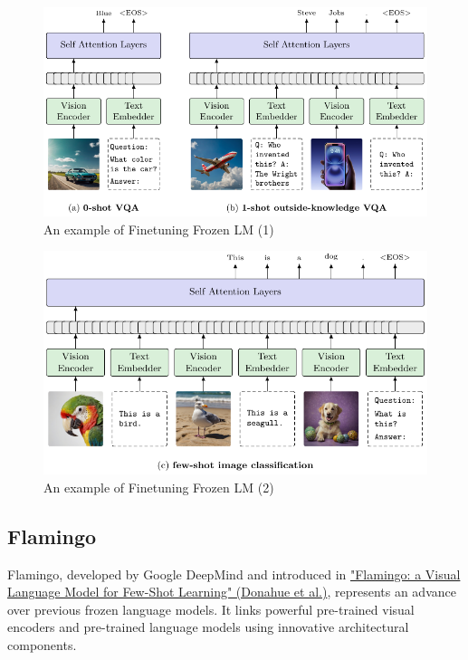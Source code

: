 \vspace{1cm}
\begin{figure}[!htbp]
    \centering
    \includegraphics[width=\linewidth]{tikz/chapter11 - Frozen LM Tasks 1.pdf}
    \caption{An example of Finetuning Frozen LM (1)}
\end{figure}

\begin{figure}[!htbp]
    \centering
    \includegraphics[width=\linewidth]{tikz/chapter11 - Frozen LM Tasks 2.pdf}
    \caption{An example of Finetuning Frozen LM (2)}
\end{figure}

\newpage
\subsection{Flamingo}

Flamingo, developed by Google DeepMind and introduced in \href{https://arxiv.org/pdf/2204.14198}{"Flamingo: a Visual Language Model for Few-Shot Learning" (Donahue et al.)}, represents an advance over previous frozen language models. It links powerful pre-trained visual encoders and pre-trained language models using innovative architectural components.

